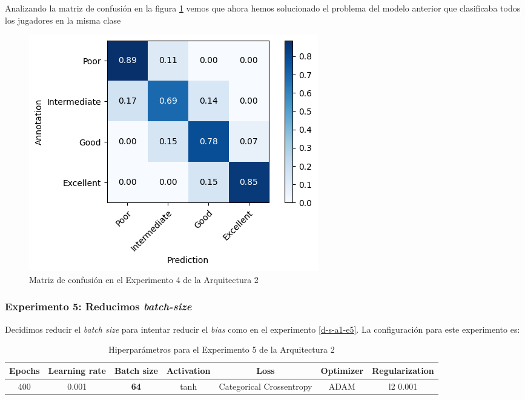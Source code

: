 \documentclass{article}
\begin{document}
			Analizando la matriz de confusi\'on en la figura \ref{d-cm-a2-e4} vemos que ahora hemos solucionado el problema del modelo anterior que clasificaba todos los jugadores en la misma clase
			\begin{figure}[!h]
				\begin{center}
					\includegraphics[scale=0.7]{d-cm-a2-e4.png}		
					\caption{Matriz de confusi\'on en el Experimento 4 de la Arquitectura 2}	
					\label{d-cm-a2-e4}
				\end{center}
			\end{figure}
		\newpage
		\subsubsection{Experimento 5: Reducimos \textit{batch-size}}
		\label{d-s-a2-e5}
			Decidimos reducir el \textit{batch size} para intentar reducir el \textit{bias} como en el experimento \ref{d-s-a1-e5}. La configuraci\'on para este experimento es:
			\begin{table}[!h]
				\begin{tabular}{| c | c | c | c | c | c | c |}
					\textbf{Epochs} & \textbf{Learning rate} & \textbf{Batch size} & \textbf{Activation} & \textbf{Loss} & \textbf{Optimizer} & \textbf{Regularization} \\ \hline
					400 & 0.001 & \textbf{64} & tanh & Categorical Crossentropy & ADAM & l2 0.001
				\end{tabular}
				\caption{Hiperpar\'ametros para el Experimento 5 de la Arquitectura 2}
				\label{tab:hip-d-a2-e5}
			\end{table}
			
\end{document}
